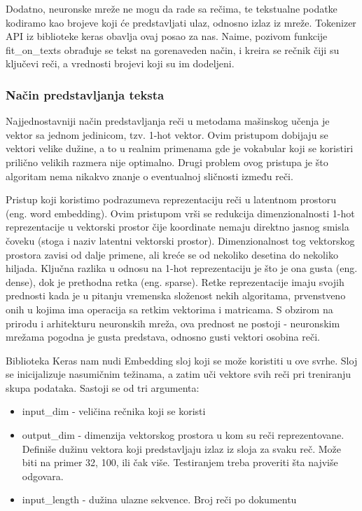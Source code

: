 \documentclass[a4paper]{article}
\begin{document}
Dodatno, neuronske mreže ne mogu da rade sa rečima, te tekstualne podatke kodiramo kao brojeve koji će predstavljati ulaz, odnosno izlaz iz mreže. Tokenizer API iz biblioteke keras obavlja ovaj posao za nas. Naime, pozivom funkcije fit\_on\_texts obrađuje se tekst na gorenaveden način, i kreira se rečnik čiji su ključevi reči, a vrednosti brojevi koji su im dodeljeni.

\subsubsection{Način predstavljanja teksta}

Najjednostavniji način predstavljanja reči u metodama mašinskog učenja je vektor sa jednom jedinicom, tzv. 1-hot vektor. Ovim pristupom dobijaju se vektori velike dužine, a to u realnim primenama gde je vokabular koji se koristiri prilično velikih razmera nije optimalno. Drugi problem ovog pristupa je što algoritam nema nikakvo znanje o eventualnoj sličnosti između reči. 

Pristup koji koristimo podrazumeva reprezentaciju reči u latentnom prostoru (eng. word embedding). Ovim pristupom vrši se redukcija dimenzionalnosti 1-hot reprezentacije u vektorski prostor čije koordinate nemaju direktno jasnog smisla čoveku (stoga i naziv latentni vektorski prostor). Dimenzionalnost tog vektorskog prostora zavisi od dalje primene, ali kreće se od nekoliko desetina do nekoliko hiljada.  Ključna razlika u odnosu na 1-hot reprezentaciju je što je ona gusta (eng. dense), dok je prethodna retka (eng. sparse). Retke reprezentacije imaju svojih prednosti kada je u pitanju vremenska složenost nekih algoritama, prvenstveno onih u kojima ima operacija sa retkim vektorima i matricama. S obzirom na prirodu i arhitekturu neuronskih mreža, ova prednost ne postoji - neuronskim mrežama pogodna je gusta predstava, odnosno gusti vektori osobina reči.

Biblioteka Keras nam nudi Embedding sloj koji se može koristiti u ove svrhe. Sloj se inicijalizuje nasumičnim težinama, a zatim uči vektore svih reči pri treniranju skupa podataka. Sastoji se od tri argumenta: 
\begin{itemize}
    \item input\_dim - veličina rečnika koji se koristi 
    \item output\_dim - dimenzija vektorskog prostora u kom su reči reprezentovane. Definiše dužinu vektora koji predstavljaju izlaz iz sloja za svaku reč. Može biti na primer 32, 100, ili čak više. Testiranjem treba proveriti šta najviše odgovara.
    \item input\_length - dužina ulazne sekvence. Broj reči po dokumentu
\end{itemize}
\end{document}

